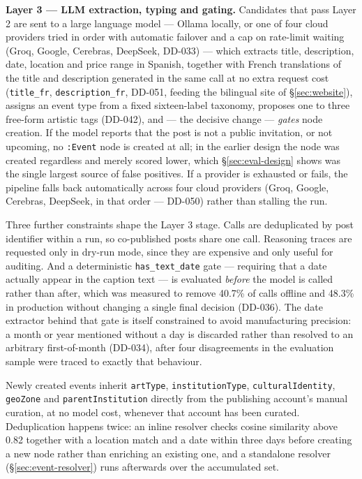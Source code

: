 \documentclass[12pt, a4paper]{report}
\begin{document}
\textbf{Layer 3 — LLM extraction, typing and gating.} Candidates that
pass Layer 2 are sent to a large language model — Ollama locally, or one
of four cloud providers tried in order with automatic failover and a cap
on rate-limit waiting (Groq, Google, Cerebras, DeepSeek, DD-033) — which
extracts title, description, date, location and price range in Spanish,
together with French translations of the title and description generated
in the same call at no extra request cost (\texttt{title\_fr},
\texttt{description\_fr}, DD-051, feeding the bilingual site of
\S\ref{sec:website}), assigns an event type from a fixed sixteen-label
taxonomy, proposes one to three free-form artistic tags (DD-042), and —
the decisive change — \emph{gates} node creation. If the model reports
that the post is not a public invitation, or not upcoming, no
\texttt{:Event} node is created at all; in the earlier design the node
was created regardless and merely scored lower, which
\S\ref{sec:eval-design} shows was the single largest source of false
positives. If a provider is exhausted or fails, the pipeline falls back
automatically across four cloud providers (Groq, Google, Cerebras,
DeepSeek, in that order — DD-050) rather than stalling the run.

Three further constraints shape the Layer 3 stage. Calls are deduplicated
by post identifier within a run, so co-published posts share one call.
Reasoning traces are requested only in dry-run mode, since they are
expensive and only useful for auditing. And a deterministic
\texttt{has\_text\_date} gate — requiring that a date actually appear in
the caption text — is evaluated \emph{before} the model is called rather
than after, which was measured to remove 40.7\% of calls offline and
48.3\% in production without changing a single final decision (DD-036).
The date extractor behind that gate is itself constrained to avoid
manufacturing precision: a month or year mentioned without a day is
discarded rather than resolved to an arbitrary first-of-month (DD-034),
after four disagreements in the evaluation sample were traced to exactly
that behaviour.

Newly created events inherit \texttt{artType}, \texttt{institutionType},
\texttt{culturalIdentity}, \texttt{geoZone} and \texttt{parentInstitution}
directly from the publishing account's manual curation, at no model cost,
whenever that account has been curated. Deduplication happens twice: an
inline resolver checks cosine similarity above 0.82 together with a
location match and a date within three days before creating a new node
rather than enriching an existing one, and a standalone resolver
(\S\ref{sec:event-resolver}) runs afterwards over the accumulated set.
\end{document}
